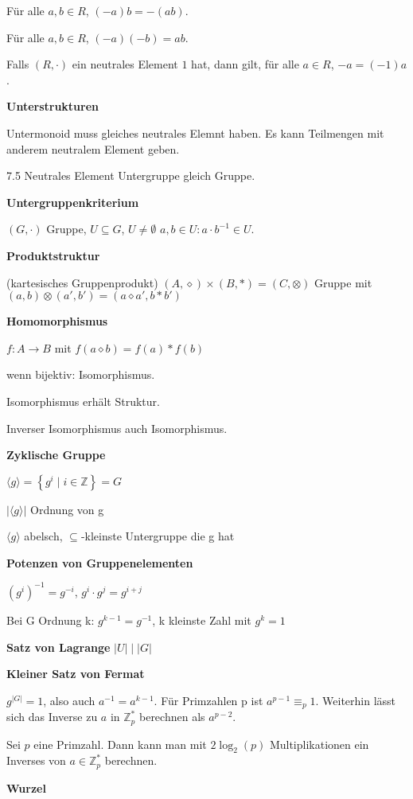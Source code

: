 \documentclass[a4paper,10pt]{article}
\newcommand{\integers}{\mathbb{Z}}
\newcommand{\set}[2]{\left\{#1 \mid #2\right\}}
\begin{document}
\begin{multicols}{3}
Für alle $a,b \in R$, $(-a)b = -(ab)$.

Für alle $a,b \in R$, $(-a)(-b) = ab$.

Falls $(R,\cdot)$ ein neutrales Element $1$ hat, dann gilt, für alle $a \in R$, $-a = (-1)a$.

\textbf{Unterstrukturen}

Untermonoid muss gleiches neutrales Elemnt haben. Es kann Teilmengen mit anderem neutralem Element geben.

7.5 Neutrales Element Untergruppe gleich Gruppe.

\textbf{Untergruppenkriterium}

$(G,\cdot)$ Gruppe, $U\subseteq G$, $U\neq \emptyset$ $a,b\in U: a\cdot b^{-1}\in U$.

\textbf{Produktstruktur}

(kartesisches Gruppenprodukt) $(A,\diamond) \times (B,\ast) = (C,\otimes)$ Gruppe mit $(a,b) \otimes (a',b') = (a \diamond a',b \ast b')$

\textbf{Homomorphismus}

$f: A \to B$ mit $f(a \diamond b) = f(a) \ast f(b)$

wenn bijektiv: Isomorphismus.

Isomorphismus erhält Struktur.

Inverser Isomorphismus auch Isomorphismus.

\textbf{Zyklische Gruppe}

$\langle g \rangle = \set{g^i}{i \in \integers} = G$

$|\langle g \rangle|$ Ordnung von g

$\langle g \rangle$ abelsch, $\subseteq$-kleinste Untergruppe die g hat

\textbf{Potenzen von Gruppenelementen}

$(g^i)^{-1} = g^{-i}$, $g^i \cdot g^j = g^{i+j}$

Bei G Ordnung k: $g^{k-1} = g^{-1}$, k kleinste Zahl mit $g^k=1$

\textbf{Satz von Lagrange} $|U|\;|\;|G|$

\textbf{Kleiner Satz von Fermat}

$g^{|G|} = 1$, also auch $a^{-1} = a^{k-1}$. Für Primzahlen p ist $a^{p-1} \equiv_p 1$. Weiterhin lässt sich das Inverse zu $a$ in $\integers_p^*$ berechnen als $a^{p-2}$.

Sei $p$ eine Primzahl. Dann kann man mit $2 \log_2(p)$ Multiplikationen ein Inverses von $a \in \integers_p^*$ berechnen.

\textbf{Wurzel}


\end{multicols}
\end{document}
